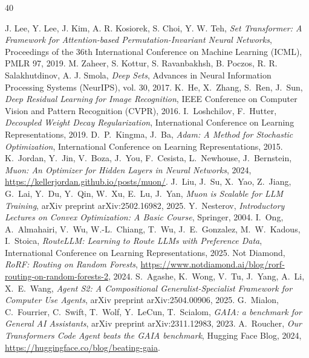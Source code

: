 \documentclass[a4paper,11pt,twoside]{report}
\theoremstyle{definition}
\begin{document}
\begin{thebibliography}{40} %

 J. Lee, Y. Lee, J. Kim, A. R. Kosiorek, S. Choi, Y. W. Teh, \emph{Set Transformer: A Framework for Attention-based Permutation-Invariant Neural Networks}, Proceedings of the 36th International Conference on Machine Learning (ICML), PMLR 97, 2019.
 M. Zaheer, S. Kottur, S. Ravanbakhsh, B. Poczos, R. R. Salakhutdinov, A. J. Smola, \emph{Deep Sets}, Advances in Neural Information Processing Systems (NeurIPS), vol. 30, 2017.
 K.~He, X.~Zhang, S.~Ren, J.~Sun, \emph{Deep Residual Learning for Image Recognition}, IEEE Conference on Computer Vision and Pattern Recognition (CVPR), 2016.
 I.~Loshchilov, F.~Hutter, \emph{Decoupled Weight Decay Regularization}, International Conference on Learning Representations, 2019.
 D.~P.~Kingma, J.~Ba, \emph{Adam: A Method for Stochastic Optimization}, International Conference on Learning Representations, 2015.
 K.~Jordan, Y.~Jin, V.~Boza, J.~You, F.~Cesista, L.~Newhouse, J.~Bernstein, \emph{Muon: An Optimizer for Hidden Layers in Neural Networks}, 2024, \url{https://kellerjordan.github.io/posts/muon/}.
 J.~Liu, J.~Su, X.~Yao, Z.~Jiang, G.~Lai, Y.~Du, Y.~Qin, W.~Xu, E.~Lu, J.~Yan, \emph{Muon is Scalable for LLM Training}, arXiv preprint arXiv:2502.16982, 2025.
 Y.~Nesterov, \emph{Introductory Lectures on Convex Optimization: A Basic Course}, Springer, 2004.
 I.~Ong, A.~Almahairi, V.~Wu, W.-L.~Chiang, T.~Wu, J.~E.~Gonzalez, M.~W.~Kadous, I.~Stoica, \emph{RouteLLM: Learning to Route LLMs with Preference Data}, International Conference on Learning Representations, 2025.
 Not Diamond, \emph{RoRF: Routing on Random Forests}, \url{https://www.notdiamond.ai/blog/rorf-routing-on-random-forests-2}, 2024.
 S.~Agashe, K.~Wong, V.~Tu, J.~Yang, A.~Li, X.~E.~Wang, \emph{Agent S2: A Compositional Generalist-Specialist Framework for Computer Use Agents}, arXiv preprint arXiv:2504.00906, 2025.
 G.~Mialon, C.~Fourrier, C.~Swift, T.~Wolf, Y.~LeCun, T.~Scialom, \emph{GAIA: a benchmark for General AI Assistants}, arXiv preprint arXiv:2311.12983, 2023.
 A.~Roucher, \emph{Our Transformers Code Agent beats the GAIA benchmark}, Hugging Face Blog, 2024, \url{https://huggingface.co/blog/beating-gaia}.

\end{thebibliography}
\end{document}
